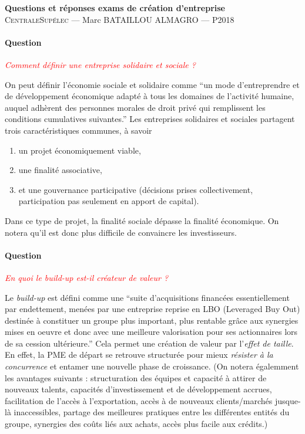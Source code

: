 \documentclass[12pt,oneside,a4paper]{article}
\newcommand{\question}[1]
{
\addtocounter{section}{1}
\paragraph*{Question \thesection}
\emph{\textcolor{red}{#1}}
}
\begin{document}
\begin{center}
{\LARGE \bfseries 
 Questions et réponses exams de création d'entreprise \\[0.3cm] 
}
{\large
  \textsc{CentraleSupélec} --- Marc BATAILLOU ALMAGRO --- P2018\\[0.7cm]
}
\end{center}
\question{Comment définir une entreprise solidaire et sociale ?}
On peut définir l'économie sociale et solidaire comme ``un mode d'entreprendre et de développement
économique adapté à tous les domaines de l'activité humaine, 
auquel adhèrent des personnes morales de droit privé qui remplissent les conditions cumulatives suivantes.''
Les entreprises solidaires et sociales partagent trois caractéristiques communes, à savoir
\begin{enumerate}
  \item un projet économiquement viable,
  \item une finalité associative,
  \item et une gouvernance participative (décisions prises collectivement, participation pas seulement en apport de capital).
\end{enumerate}
Dans ce type de projet, la finalité sociale dépasse la finalité économique.
On notera qu'il est donc plus difficile de convaincre les investisseurs.
  
\question{En quoi le build-up est-il créateur de valeur ?}
Le \emph{build-up} est défini comme une ``suite d'acquisitions financées essentiellement
par endettement, menées par une entreprise reprise en LBO (Leveraged Buy Out) destinée 
à constituer un groupe plus important, plus rentable grâce aux synergies mises en oeuvre 
et donc avec une meilleure valorisation pour ses actionnaires lors de sa cession ultérieure.''
Cela permet une création de valeur par l'\emph{effet de taille}.
En effet, la PME de départ se retrouve structurée 
pour mieux \emph{résister à la concurrence} et entamer une nouvelle phase de croissance.
(On notera égalemment les avantages suivants : 
structuration des équipes et capacité à attirer de nouveaux talents,
capacités d’investissement et de développement accrues,
facilitation de l’accès à l’exportation, 
accès à de nouveaux clients/marchés jusque-là inaccessibles,
partage des meilleures pratiques entre les différentes entités du groupe,
synergies des coûts liés aux achats, accès plus facile aux crédits.)
  
\end{document}
